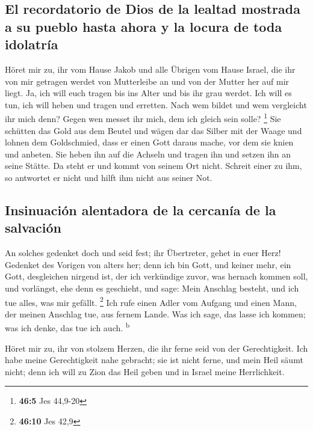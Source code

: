 \hypertarget{el-recordatorio-de-dios-de-la-lealtad-mostrada-a-su-pueblo-hasta-ahora-y-la-locura-de-toda-idolatruxeda}{%
\subsection{El recordatorio de Dios de la lealtad mostrada a su pueblo
hasta ahora y la locura de toda
idolatría}\label{el-recordatorio-de-dios-de-la-lealtad-mostrada-a-su-pueblo-hasta-ahora-y-la-locura-de-toda-idolatruxeda}}

 Höret mir zu, ihr vom Hause Jakob und alle Übrigen vom
Hause Israel, die ihr von mir getragen werdet von Mutterleibe an und von
der Mutter her auf mir liegt.  Ja, ich will euch tragen
bis ins Alter und bis ihr grau werdet. Ich will es tun, ich will heben
und tragen und erretten.  Nach wem bildet und wem
vergleicht ihr mich denn? Gegen wen messet ihr mich, dem ich gleich sein
solle? \footnote{\textbf{46:5} Jes 44,9-20}  Sie schütten
das Gold aus dem Beutel und wägen dar das Silber mit der Waage und
lohnen dem Goldschmied, dass er einen Gott daraus mache, vor dem sie
knien und anbeten.  Sie heben ihn auf die Achseln und
tragen ihn und setzen ihn an seine Stätte. Da steht er und kommt von
seinem Ort nicht. Schreit einer zu ihm, so antwortet er nicht und hilft
ihm nicht aus seiner Not.

\hypertarget{insinuaciuxf3n-alentadora-de-la-cercanuxeda-de-la-salvaciuxf3n}{%
\subsection{Insinuación alentadora de la cercanía de la
salvación}\label{insinuaciuxf3n-alentadora-de-la-cercanuxeda-de-la-salvaciuxf3n}}

 An solches gedenket doch und seid fest; ihr Übertreter,
gehet in euer Herz!  Gedenket des Vorigen von alters her;
denn ich bin Gott, und keiner mehr, ein Gott, desgleichen nirgend ist,
 der ich verkündige zuvor, was hernach kommen soll, und
vorlängst, ehe denn es geschieht, und sage: Mein Anschlag besteht, und
ich tue alles, was mir gefällt. \footnote{\textbf{46:10} Jes 42,9}
 Ich rufe einen Adler vom Aufgang und einen Mann, der
meinen Anschlag tue, aus fernem Lande. Was ich sage, das lasse ich
kommen; was ich denke, das tue ich auch. \textsuperscript{b}

 Höret mir zu, ihr von stolzem Herzen, die ihr ferne seid
von der Gerechtigkeit.  Ich habe meine Gerechtigkeit nahe
gebracht; sie ist nicht ferne, und mein Heil säumt nicht; denn ich will
zu Zion das Heil geben und in Israel meine Herrlichkeit.

